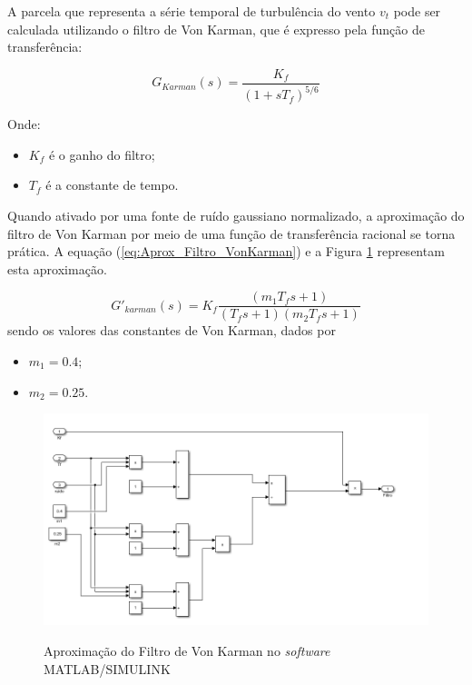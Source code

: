 \par A parcela que representa a série temporal de turbulência do vento \(v_{t}\) pode ser calculada utilizando o filtro de Von Karman, que é expresso pela função de transferência:

\begin{equation}
G_{Karman}(s) = \frac{K_f}{(1 + sT_f)^{5/6}}
\end{equation}

Onde:
\begin{itemize}
    \item \(K_f\) é o ganho do filtro;
    \item \(T_f\) é a constante de tempo.
\end{itemize}

\par Quando ativado por uma fonte de ruído gaussiano normalizado, a aproximação do filtro de Von Karman por meio de uma função de transferência racional se torna prática. A equação (\ref{eq:Aprox_Filtro_VonKarman}) e a Figura \ref{fig:Aprox_Filtro_VonKarman} representam esta aproximação.

\begin{equation}
G'_{karman}(s) = K_f \frac{(m_1 T_f s + 1)}{(T_f s + 1)(m_2 T_f s + 1)}
\label{eq:Aprox_Filtro_VonKarman}
\end{equation}
sendo os valores das constantes de Von Karman, dados por
\begin{itemize}
    \item \(m_1 = 0.4\);
    \item \(m_2 = 0.25\).
\end{itemize}

\begin{figure}[h]
    \centering
    \caption{Aproximação do Filtro de Von Karman no \textit{software} MATLAB/SIMULINK}
    \includegraphics[width=\textwidth]{Figuras/Teorico/Aprox_Filtro_VonKarman.png}
    \label{fig:Aprox_Filtro_VonKarman}
    
\end{figure}

